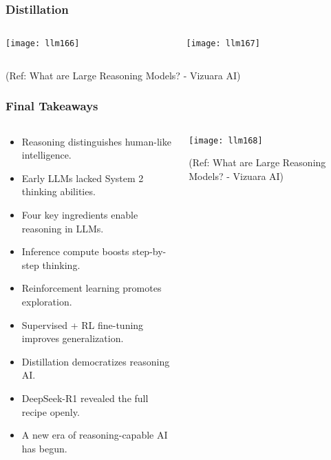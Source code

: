 \begin{frame}[fragile]\frametitle{Distillation}


\begin{columns}
    \begin{column}[T]{0.5\linewidth}
		\begin{center}
		\texttt{[image: llm166]}
		\end{center}

    \end{column}
    \begin{column}[T]{0.5\linewidth}
		\begin{center}
		\texttt{[image: llm167]}
		\end{center}
    \end{column}
  \end{columns}
  

{\tiny (Ref: What are Large Reasoning Models? - Vizuara AI)}

\end{frame}

\begin{frame}[fragile]\frametitle{Final Takeaways}

\begin{columns}
    \begin{column}[T]{0.5\linewidth}
		\begin{itemize}
		  \item Reasoning distinguishes human-like intelligence.
		  \item Early LLMs lacked System 2 thinking abilities.
		  \item Four key ingredients enable reasoning in LLMs.
		  \item Inference compute boosts step-by-step thinking.
		  \item Reinforcement learning promotes exploration.
		  \item Supervised + RL fine-tuning improves generalization.
		  \item Distillation democratizes reasoning AI.
		  \item DeepSeek-R1 revealed the full recipe openly.
		  \item A new era of reasoning-capable AI has begun.
		\end{itemize}

    \end{column}
    \begin{column}[T]{0.5\linewidth}
		\begin{center}
		\texttt{[image: llm168]}
		
		{\tiny (Ref: What are Large Reasoning Models? - Vizuara AI)}
		
		\end{center}
    \end{column}
  \end{columns}
  
\end{frame}
